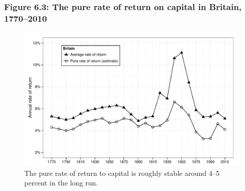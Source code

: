 \documentclass[t]{beamer}\usepackage[]{graphicx}\usepackage[]{color}
\newenvironment{knitrout}{}{} %
\begin{document}
\begin{frame}[label=Figure_6_3]
\frametitle{Figure 6.3: The pure rate of return on capital in Britain, 1770--2010}
\begin{figure}[t]
\begin{minipage}[b]{\textwidth}
\centering
\begin{knitrout}\footnotesize
{}\color{fgcolor}

{\centering \includegraphics[width=1\linewidth]{figures/bw/Figure_6_3} 

}



\end{knitrout}
\caption{The pure rate of return to capital is roughly stable around 4--5 percent in the long run.}
\end{minipage}
\end{figure}
\end{frame}
\end{document}
